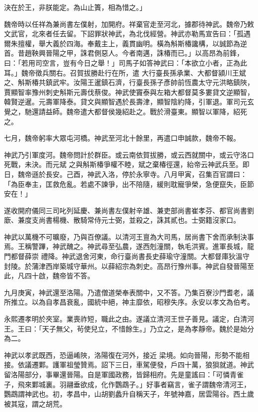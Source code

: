 \begin{pinyinscope}
 決在於王，非朕能定。為山止簣，相為惜之。」



 魏帝時以任祥為兼尚書左僕射，加開府。祥棄官走至河北，據郡待神武。魏帝乃敕文武官，北來者任去留。下詔罪狀神武，為北伐經營。神武亦勒馬宣告曰：「孤遇爾朱擅權，舉大義於四海。奉戴主上，義貫幽明。橫為斛斯椿讒構，以誠節為逆首。昔趙鞅興晉陽之甲，誅君側惡人。今者南邁，誅椿而已。」以高昂為前鋒，曰：「若用司空言，豈有今日之舉！」司馬子如答神武曰：「本欲立小者，正為此耳。」魏帝徵兵關右。召賀拔勝赴行在所，遣
 大行臺長孫承業、大都督潁川王斌之、斛斯椿共鎮武牢。汝陽王暹鎮石濟，行臺長孫子彥帥前恆農太守元洪略鎮陜，賈顯智率豫州刺史斛斯元壽伐蔡俊。神武使竇泰與左箱大都督莫多婁貸文逆顯智，韓賢逆暹。元壽軍降泰。貸文與顯智遇於長壽津，顯智陰約降，引軍退。軍司元玄覺之，馳還請益師。魏帝遣大都督侯幾紹赴之。戰於滑臺東。顯智以軍降，紹死之。



 七月，魏帝躬率大眾屯河橋。神武至河北十餘里，再遣口申誠款，魏帝不報。



 神武乃引軍度河。魏帝問計於群臣。或云南依賀拔勝，或云西就關中，或云守洛口死戰，未決。而元斌
 之與斛斯椿爭權不睦，斌之棄椿徑還，紿帝云神武兵至。即日，魏帝遜於長安。己酉，神武入洛，停於永寧寺。八月甲寅，召集百官謂曰：「為臣奉主，匡救危亂。若處不諫爭，出不陪隨，緩則耽寵爭榮，急便竄失，臣節安在！」



 遂收開府儀同三司叱列延慶、兼尚書左僕射辛雄、兼吏部尚書崔孝芬、都官尚書劉廞、兼度支尚書楊機、散騎常侍元士弼，並殺之，誅其貳也。士弼籍沒家口。



 神武以萬機不可曠廢，乃與百僚議。以清河王亶為大司馬，居尚書下舍而承制決事焉。王稱警蹕，神武醜之。神武尋至弘農，遂西剋潼關，執毛洪賓。進軍長城，龍門都督薛崇
 禮降。神武退舍河東，命行臺尚書長史薛瑜守潼關。大都督庫狄溫守封陵。於蒲津西岸築城守華州。以薛紹宗為刺史。高昂行豫州事。神武自發晉陽至此，凡四十啟，魏帝皆不答。



 九月庚寅，神武還至洛陽。乃遣僧道榮奉表關中，又不答。乃集百寮沙門耆老，議所推立。以為自孝昌衰亂，國統中絕，神主靡依，昭穆失序。永安以孝文為伯考。



 永熙遷孝明於夾室。業喪祚短，職此之由。遂議立清河王世子善見。議定，白清河王。王曰：「天子無父，茍使兒立，不惜餘生。」乃立之，是為孝靜帝。魏於是始分為二。



 神武以孝武既西，恐逼崤陜，洛陽復在河外，接近
 梁境。如向晉陽，形勢不能相接。依議遷鄴。護軍祖瑩贊焉。詔下三日，車駕便發，戶四十萬，狼狽就道。神武留洛陽部分，事畢還晉陽。自是軍國政務，皆歸相府。先是童謠曰：「可憐青雀子，飛來鄴城裏。羽翮垂欲成，化作鸚鵡子。」好事者竊言，雀子謂魏帝清河王，鸚鵡謂神武也。初，孝昌中，山胡劉蠡升自稱天子，年號神嘉，居雲陽谷。西土歲被其寇，謂之胡荒。




\end{pinyinscope}
